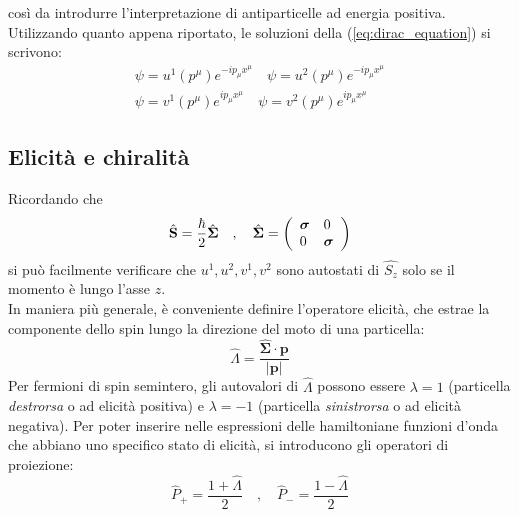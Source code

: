 \documentclass{subnucbo}
\begin{document}
così da introdurre l'interpretazione di antiparticelle ad energia positiva. Utilizzando quanto appena riportato, le soluzioni della (\ref{eq:dirac_equation}) si scrivono:
\begin{equation}
        \begin{align}
                \psi = u ^ { 1 } \left( p ^ { \mu } \right) e ^ { - i p_{\mu} x^{\mu} } \quad \psi = u ^ { 2 } \left( p ^ { \mu } \right) e ^ { - i p_{\mu} x^{\mu} } \\ \psi = v ^ { 1 } \left( p ^ { \mu } \right) e ^ {  i p_{\mu}  x^{\mu} } \quad \psi = v ^ { 2 } \left( p ^ { \mu } \right) e ^ {  i p_{\mu} x^{\mu} }
        \end{align}
        \label{eq:u1u2v1v2}
\end{equation}

\subsection{Elicità e chiralità}
Ricordando che
\begin{equation}
        \hat{\mathbf { S } } = \frac { \hbar } { 2 } \hat{\mathbf { \Sigma } } \quad , \quad \hat{\mathbf { \Sigma } } = \left( \begin{array} { l l } { \boldsymbol{\sigma }} & { 0 } \\ { 0 } & { \boldsymbol{\sigma} } \end{array} \right)
\end{equation}
si può facilmente verificare che $u^{1}, u^{2}, v^{1}, v^{2}$ sono autostati di $\hat { S _ { z } }$ solo se il momento è lungo l'asse $z$. \\
In maniera più generale, è conveniente definire l'operatore elicità, che estrae la componente dello spin lungo la direzione del moto di una particella:
\begin{equation}
        \hat { \Lambda }  = \frac { \hat { \mathbf { \Sigma } } \cdot \mathbf{p} } { |\mathbf{p}| }
        \label{eq:helicity}
\end{equation}
Per fermioni di spin semintero, gli autovalori di $\hat{\Lambda}$ possono essere $\lambda=1$ (particella \textit{destrorsa} o ad elicità positiva) e $\lambda=-1$ (particella \textit{sinistrorsa} o ad elicità negativa). Per poter inserire nelle espressioni delle hamiltoniane funzioni d'onda che abbiano uno specifico stato di elicità, si introducono gli operatori di proiezione:
\begin{equation}
        \hat { P } _ { + } = \frac { 1 + \hat { \Lambda } } { 2 } \quad , \quad \hat { P }_{-} = \frac { 1 - \hat { \Lambda } } { 2 }
        \label{eq:projection_operators}
\end{equation}
\end{document}
